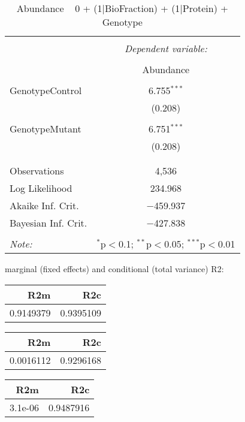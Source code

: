 \documentclass[11pt]{report}
\begin{document}
\begin{table}[!htbp] \centering 
  \caption{Abundance ~ 0 + (1|BioFraction) + (1|Protein) + Genotype} 
  \label{} 
\begin{tabular}{@{\extracolsep{5pt}}lc} 
\\[-1.8ex]\hline 
\hline \\[-1.8ex] 
 & \multicolumn{1}{c}{\textit{Dependent variable:}} \\ 
\cline{2-2} 
\\[-1.8ex] & Abundance \\ 
\hline \\[-1.8ex] 
 GenotypeControl & 6.755$^{***}$ \\ 
  & (0.208) \\ 
  & \\ 
 GenotypeMutant & 6.751$^{***}$ \\ 
  & (0.208) \\ 
  & \\ 
\hline \\[-1.8ex] 
Observations & 4,536 \\ 
Log Likelihood & 234.968 \\ 
Akaike Inf. Crit. & $-$459.937 \\ 
Bayesian Inf. Crit. & $-$427.838 \\ 
\hline 
\hline \\[-1.8ex] 
\textit{Note:}  & \multicolumn{1}{r}{$^{*}$p$<$0.1; $^{**}$p$<$0.05; $^{***}$p$<$0.01} \\ 
\end{tabular} 
\end{table} 
marginal (fixed effects) and conditional (total variance) R2:

\begin{tabular}{r|r}
\hline
R2m & R2c\\
\hline
0.9149379 & 0.9395109\\
\hline
\end{tabular}

\begin{tabular}{r|r}
\hline
R2m & R2c\\
\hline
0.0016112 & 0.9296168\\
\hline
\end{tabular}

\begin{tabular}{r|r}
\hline
R2m & R2c\\
\hline
3.1e-06 & 0.9487916\\
\hline
\end{tabular}
\end{document}
